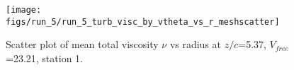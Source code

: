 \begin{figure}[H]
\centering
\texttt{[image: figs/run\_5/run\_5\_turb\_visc\_by\_vtheta\_vs\_r\_meshscatter]}
\caption{Scatter plot of mean total viscosity $\nu$ vs radius at $z/c$=5.37, $V_{free}$=23.21, station 1.}
\label{fig:run_5_turb_visc_by_vtheta_vs_r_meshscatter}
\end{figure}


